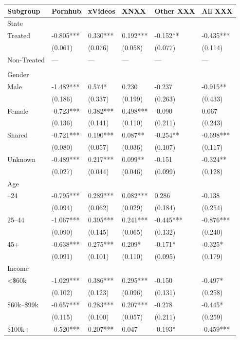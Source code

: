 
\begin{tabular}{llllll}
\toprule
Subgroup & Pornhub & xVideos & XNXX & Other XXX & All XXX\\
\midrule
State &  &  &  &  & \\
Treated & -0.805*** & 0.330*** & 0.192*** & -0.152** & -0.435***\\
 & (0.061) & (0.076) & (0.058) & (0.077) & (0.114)\\
Non-Treated & — & — & — & — & —\\
 &  &  &  &  & \\
\addlinespace
Gender &  &  &  &  & \\
Male & -1.482*** & 0.574* & 0.230 & -0.237 & -0.915**\\
 & (0.186) & (0.337) & (0.199) & (0.263) & (0.433)\\
Female & -0.723*** & 0.382*** & 0.498*** & -0.090 & 0.067\\
 & (0.136) & (0.141) & (0.110) & (0.211) & (0.243)\\
\addlinespace
Shared & -0.721*** & 0.190*** & 0.087** & -0.254** & -0.698***\\
 & (0.080) & (0.057) & (0.036) & (0.107) & (0.117)\\
Unknown & -0.489*** & 0.217*** & 0.099** & -0.151 & -0.324**\\
 & (0.027) & (0.044) & (0.046) & (0.099) & (0.128)\\
Age &  &  &  &  & \\
\addlinespace
18–24 & -0.795*** & 0.289*** & 0.082*** & 0.286 & -0.138\\
 & (0.094) & (0.062) & (0.029) & (0.184) & (0.254)\\
25–44 & -1.067*** & 0.395*** & 0.241*** & -0.445*** & -0.876***\\
 & (0.090) & (0.145) & (0.065) & (0.132) & (0.240)\\
45+ & -0.638*** & 0.275*** & 0.209* & -0.171* & -0.325*\\
\addlinespace
 & (0.091) & (0.101) & (0.110) & (0.095) & (0.179)\\
Income &  &  &  &  & \\
<\$60k & -1.029*** & 0.386*** & 0.295*** & -0.150 & -0.497*\\
 & (0.102) & (0.123) & (0.096) & (0.131) & (0.258)\\
\$60k–\$99k & -0.657*** & 0.283*** & 0.207*** & -0.278 & -0.445*\\
\addlinespace
 & (0.115) & (0.100) & (0.057) & (0.211) & (0.259)\\
\$100k+ & -0.520*** & 0.207*** & 0.047 & -0.193* & -0.459***\\

\end{tabular}
